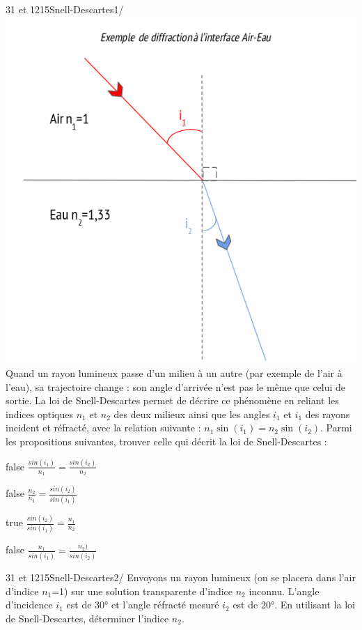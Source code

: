 	    \begin{question}{31 et 1215}{Snell-Descartes}{1}{/}
         	\includegraphics[width=\textwidth]{Christopher/Figures_Christopher/SD_UE.png}
				Quand un rayon lumineux passe d'un milieu à un autre (par exemple de l'air à l'eau), sa trajectoire change : son angle d'arrivée n'est pas le même que celui de sortie. La loi de Snell-Descartes permet de décrire ce phénomène en reliant les indices optiques $n_1$ et $n_2$ des deux milieux ainsi que les angles  $i_1$ et  $i_1$ des rayons incident et réfracté, avec la relation suivante  : $n_1\sin(i_1)=n_2\sin(i_2)$. Parmi les propositions suivantes, trouver celle qui décrit la loi de Snell-Descartes : 
            \end{question}
            \begin{reponses}
            	\item[false] $\frac{sin(i_1)}{n_1}=\frac{sin(i_2)}{n_2}$
            	\item[false] $\frac{n_2}{n_1}=\frac{sin(i_2)}{sin(i_1)}$
                \item[true] $\frac{sin(i_2)}{sin(i_1)}=\frac{n_1}{n_2}$
                \item[false] $\frac{n_1}{sin(i_1)}=\frac{n_2)}{sin(i_2)}$
            \end{reponses}
        	\begin{question}{31 et 1215}{Snell-Descartes}{2}{/}
				Envoyons un rayon lumineux (on se placera dans l'air d'indice $n_1$=1) sur une solution transparente d'indice $n_2$ inconnu. L'angle d'incidence $i_1$ est de $30\si\degree$ et l'angle réfracté mesuré $i_2$ est de $20\si\degree$. En utilisant la loi de Snell-Descartes, déterminer l'indice $n_2$.
            \end{question}
